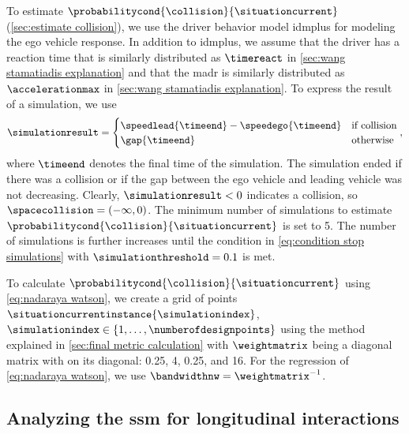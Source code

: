To estimate $\probabilitycond{\collision}{\situationcurrent}$ (\cref{sec:estimate collision}), we use the driver behavior model \ac{idmplus} \autocite{schakel2010effects} for modeling the ego vehicle response.
In addition to \ac{idmplus}, we assume that the driver has a reaction time that is similarly distributed as $\timereact$ in \cref{sec:wang stamatiadis explanation} and that the \ac{madr} is similarly distributed as $\accelerationmax$ in \cref{sec:wang stamatiadis explanation}.
To express the result of a simulation, we use
\begin{equation}
	\simulationresult = \begin{cases}
		\speedlead{\timeend} - \speedego{\timeend} & \text{if collision} \\
		\gap{\timeend} & \text{otherwise}
	\end{cases},
\end{equation}
where $\timeend$ denotes the final time of the simulation.
The simulation ended if there was a collision or if the gap between the ego vehicle and leading vehicle was not decreasing.
Clearly, $\simulationresult<0$ indicates a collision, so $\spacecollision=(-\infty, 0)$.
\cstarta The minimum number of simulations to estimate $\probabilitycond{\collision}{\situationcurrent}$ is set to 5. 
The number of simulations is further increases until the condition in \cref{eq:condition stop simulations} with $\simulationthreshold=0.1$ is met. \cenda

To calculate $\probabilitycond{\collision}{\situationcurrent}$ using \cref{eq:nadaraya watson}, we create a grid of points $\situationcurrentinstance{\simulationindex}$, $\simulationindex\in\{1,\ldots,\numberofdesignpoints\}$ using the method explained in \cref{sec:final metric calculation} with $\weightmatrix$ being a diagonal matrix with on its diagonal: 0.25, 4, 0.25, and 16.
For the regression of \cref{eq:nadaraya watson}, we use $\bandwidthnw=\weightmatrix^{-1}$.



\subsection{Analyzing the \acs{ssm} for longitudinal interactions}
\label{sec:analyzing ngsim metric}

